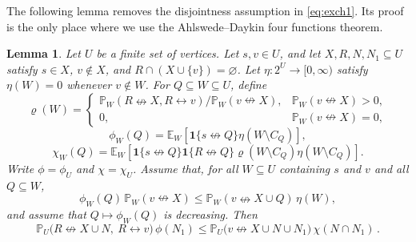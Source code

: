 \documentclass[11pt]{article}
\newtheorem{lemma}[theorem]{Lemma}
\theoremstyle{definition}
\theoremstyle{remark}
\newcommand{\PP}{\mathbb P}
\newcommand{\EE}{\mathbb E}
\newcommand{\one}{\mathbf 1}
\newcommand{\con}{\leftrightarrow}
\newcommand{\ncon}{\nleftrightarrow}
\begin{document}
The following lemma removes the disjointness assumption in \eqref{eq:exch1}. Its proof is
the only place where we use the Ahlswede--Daykin four functions theorem.

\begin{lemma}\label{lem:overlapavoid}
Let $U$ be a finite set of vertices. Let $s,v\in U$, and let $X,R,N,N_1\subseteq U$ satisfy
$s\in X$, $v\notin X$, and $R\cap(X\cup\{v\})=\varnothing$. Let
$\eta:2^U\to[0,\infty)$ satisfy $\eta(W)=0$ whenever $v\notin W$. For
$Q\subseteq W\subseteq U$, define
\[
 \varrho(W)=
 \begin{cases}
 \PP_W(R\ncon X,R\con v)/\PP_W(v\ncon X),&\PP_W(v\ncon X)>0,\\
 0,&\PP_W(v\ncon X)=0,
 \end{cases}
\]
\[
 \phi_W(Q)=\EE_W[\one\{s\ncon Q\}\eta(W\setminus C_Q)],
\]
\[
 \chi_W(Q)=\EE_W[\one\{s\ncon Q\}\one\{R\ncon Q\}
 \varrho(W\setminus C_Q)\eta(W\setminus C_Q)].
\]
Write $\phi=\phi_U$ and $\chi=\chi_U$. Assume that, for all $W\subseteq U$ containing
$s$ and $v$ and all $Q\subseteq W$,
\begin{equation}\label{eq:stopped-general}
 \phi_W(Q)\,\PP_W(v\ncon X)
 \leq \PP_W(v\ncon X\cup Q)\,\eta(W),
\end{equation}
and assume that $Q\mapsto\phi_W(Q)$ is decreasing. Then
\begin{equation}\label{eq:twosource}
 \PP_U\bigl(R\ncon X\cup N,\ R\con v\bigr)\,\phi(N_1)
 \leq \PP_U\bigl(v\ncon X\cup N\cup N_1\bigr)\,\chi(N\cap N_1)\,.
\end{equation}
\end{lemma}
\end{document}
